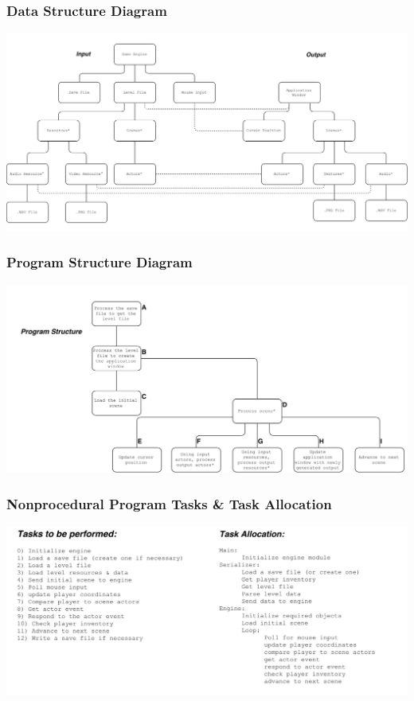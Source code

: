 \documentclass{article}
\begin{document}
		\subsubsection{Data Structure Diagram}
			\begin{center}
				\includegraphics[scale=0.45,angle=90]{Jackson1.png}
			\end{center}
		\subsubsection{Program Structure Diagram}
			\begin{center}
				\includegraphics[scale=0.5,angle=90]{Jackson2.png}
			\end{center}
		\subsubsection{Nonprocedural Program Tasks \& Task Allocation}
			\begin{center}
				\includegraphics[scale=0.74,angle=90]{Jackson34.png}
			\end{center}
\end{document}
